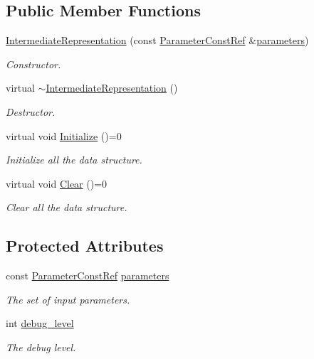 \subsection*{Public Member Functions}
\begin{DoxyCompactItemize}
\item 
\hyperlink{classIntermediateRepresentation_adf706cd60d98eb7f72ec013d2adccc2f}{Intermediate\+Representation} (const \hyperlink{Parameter_8hpp_a37841774a6fcb479b597fdf8955eb4ea}{Parameter\+Const\+Ref} \&\hyperlink{classIntermediateRepresentation_a1dec82655a3ccf5023a1d3bb9805ce8c}{parameters})
\begin{DoxyCompactList}\small\item\em Constructor. \end{DoxyCompactList}\item 
virtual \hyperlink{classIntermediateRepresentation_a8a513246a40ce403a30d538e54cb0945}{$\sim$\+Intermediate\+Representation} ()
\begin{DoxyCompactList}\small\item\em Destructor. \end{DoxyCompactList}\item 
virtual void \hyperlink{classIntermediateRepresentation_ae09602bb8001b048690ce2a48347db36}{Initialize} ()=0
\begin{DoxyCompactList}\small\item\em Initialize all the data structure. \end{DoxyCompactList}\item 
virtual void \hyperlink{classIntermediateRepresentation_a93091bd456d4ca43bdbd41016c728c0d}{Clear} ()=0
\begin{DoxyCompactList}\small\item\em Clear all the data structure. \end{DoxyCompactList}\end{DoxyCompactItemize}
\subsection*{Protected Attributes}
\begin{DoxyCompactItemize}
\item 
const \hyperlink{Parameter_8hpp_a37841774a6fcb479b597fdf8955eb4ea}{Parameter\+Const\+Ref} \hyperlink{classIntermediateRepresentation_a1dec82655a3ccf5023a1d3bb9805ce8c}{parameters}
\begin{DoxyCompactList}\small\item\em The set of input parameters. \end{DoxyCompactList}\item 
int \hyperlink{classIntermediateRepresentation_ad6cabd42e1299ae26982886beba17aad}{debug\+\_\+level}
\begin{DoxyCompactList}\small\item\em The debug level. \end{DoxyCompactList}\end{DoxyCompactItemize}



